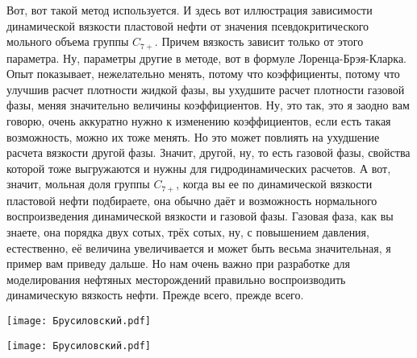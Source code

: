 \documentclass[main.tex]{subfiles}
\begin{document}
Вот, вот такой метод используется.
И здесь вот иллюстрация зависимости динамической вязкости пластовой нефти от значения псевдокритического мольного объема группы $C_{7+}$.
Причем вязкость зависит только от этого параметра.
Ну, параметры другие в методе, вот в формуле Лоренца-Брэя-Кларка.
Опыт показывает, нежелательно менять, потому что коэффициенты, потому что улучшив расчет плотности жидкой фазы, вы ухудшите расчет плотности газовой фазы, меняя значительно величины коэффициентов.
Ну, это так, это я заодно вам говорю, очень аккуратно нужно к изменению коэффициентов, если есть такая возможность, можно их тоже менять.
Но это может повлиять на ухудшение расчета вязкости другой фазы.
Значит, другой, ну, то есть газовой фазы, свойства которой тоже выгружаются и нужны для гидродинамических расчетов.
А вот, значит, мольная доля группы $C_{7+}$, когда вы ее по динамической вязкости пластовой нефти подбираете, она обычно даёт и возможность нормального воспроизведения динамической вязкости и газовой фазы.
Газовая фаза, как вы знаете, она порядка двух сотых, трёх сотых, ну, с повышением давления, естественно, её величина увеличивается и может быть весьма значительная, я пример вам приведу дальше.
Но нам очень важно при разработке для моделирования нефтяных месторождений правильно воспроизводить динамическую вязкость нефти.
Прежде всего, прежде всего.

\begin{center}
\texttt{[image: Брусиловский.pdf]}
\end{center}



\begin{center}
\texttt{[image: Брусиловский.pdf]}
\end{center}
\end{document}
